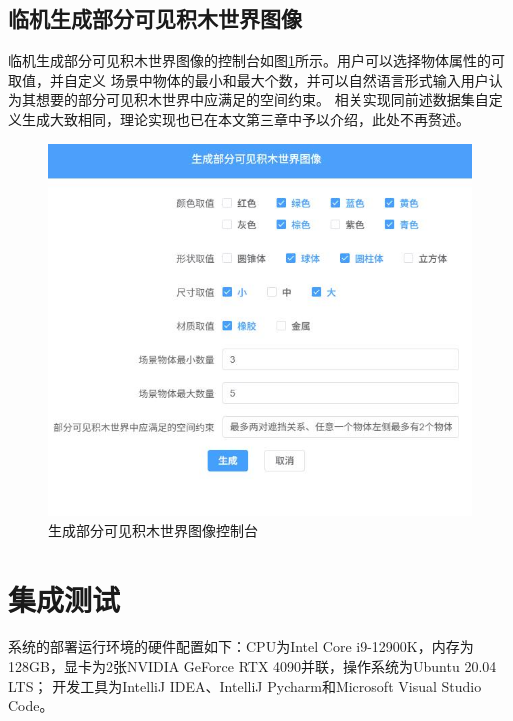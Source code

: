 \subsection{临机生成部分可见积木世界图像}
临机生成部分可见积木世界图像的控制台如图\ref{fig:blockworld-generation}所示。用户可以选择物体属性的可取值，并自定义
场景中物体的最小和最大个数，并可以自然语言形式输入用户认为其想要的部分可见积木世界中应满足的空间约束。
相关实现同前述数据集自定义生成大致相同，理论实现也已在本文第三章中予以介绍，此处不再赘述。
\begin{figure}[h]
\centering
\includegraphics[scale=0.7]{figures/blockworld-generation.jpg}
\caption{生成部分可见积木世界图像控制台}
\label{fig:blockworld-generation}
\end{figure}
\section{集成测试}
系统的部署运行环境的硬件配置如下：CPU为Intel Core i9-12900K，内存为128GB，显卡为2张NVIDIA GeForce RTX 4090并联，操作系统为Ubuntu 20.04 LTS；
开发工具为IntelliJ IDEA、IntelliJ Pycharm和Microsoft Visual Studio Code。

